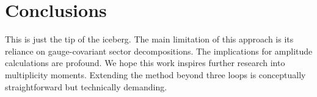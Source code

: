 \section{Conclusions}\label{sec:conclusions}

This is just the tip of the iceberg. The main limitation of this
approach is its reliance on gauge-covariant sector decompositions. The
implications for amplitude calculations are profound. We hope this work
inspires further research into multiplicity moments. Extending the
method beyond three loops is conceptually straightforward but
technically demanding.

